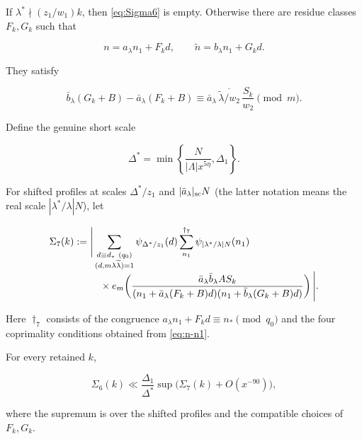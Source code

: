 If $\lambda^*\nmid(z_1/w_1)k$, then \cref{eq:Sigma6} is empty.  Otherwise
there are residue classes $F_k,G_k$ such that

\begin{equation}\label{eq:n-n1}
 n=a_\lambda n_1+F_kd,\qquad
 \widetilde n=b_\lambda n_1+G_kd.
\end{equation}

They satisfy

\begin{equation}\label{eq:FG-relation}
 \bar b_\lambda(G_k+B)-\bar a_\lambda(F_k+B)
 \equiv
 \bar a_\lambda\,\overline{\widetilde\lambda/w_2}\,
 \frac{S_k}{w_2}\pmod m.
\end{equation}

Define the genuine short scale

\begin{equation}\label{eq:Delta-star}
 \Delta^*=\min\left\{\frac{N}{|\Lambda|x^{5\eta}},\Delta_1\right\}.
\end{equation}

For shifted profiles at scales $\Delta^*/z_1$ and
$|\bar a_\lambda|_{\rm sc}N$ (the latter notation means the real scale
$|\lambda^*/\lambda|N$), let

\begin{align}
\Sigma_7(k):={}&\Bigg|
 \sum_{\substack{d\equiv d_*\ (q_0)\\
 (d,m\lambda\widetilde\lambda)=1}}
 \psi_{\Delta^*/z_1}(d)
 \sum_{n_1}^{\dagger_7}\psi_{|\lambda^*/\lambda|N}(n_1)
 \notag\\[-1mm]
&\quad\times e_m\!\left(
 \frac{\bar a_\lambda\bar b_\lambda AS_k}
 {(n_1+\bar a_\lambda(F_k+B)d)
  (n_1+\bar b_\lambda(G_k+B)d)}
 \right)\Bigg|.
 \label{eq:Sigma7}
\end{align}

Here $\dagger_7$ consists of the congruence
$a_\lambda n_1+F_kd\equiv n_*\pmod{q_0}$ and the four coprimality
conditions obtained from \cref{eq:n-n1}.

\begin{lemma}\label{lem:divisibility-elimination}
For every retained $k$,

\begin{equation}\label{eq:Sigma6-to-7}
 \Sigma_6(k)
 \ll\frac{\Delta_1}{\Delta^*}
 \sup\bigl(\Sigma_7(k)+O(x^{-90})\bigr),
\end{equation}

where the supremum is over the shifted profiles and the compatible choices
of $F_k,G_k$.
\end{lemma}


